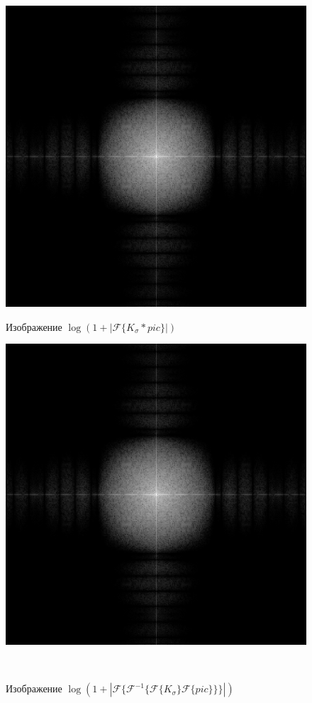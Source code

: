 \documentclass[a4paper]{article}
\begin{document}
\begin{figure}[H]
    \begin{minipage}{0.49\textwidth}
        \centering \includegraphics[width=\textwidth]{2/19_abs_fourier_log_norm_img_gaussian.png}
        \caption{Изображение $\log{(1+|\mathcal{F}\{K_\sigma*pic\}|)}$}
    \end{minipage}\hfill
    \begin{minipage}{0.49\textwidth}
        \centering \includegraphics[width=\textwidth]{2/19_abs_fourier_log_norm_img_gaussian1.png}
        \caption{Изображение $\log{(1+|\mathcal{F}\{\mathcal{F}^{-1}\{ \mathcal{F}\{K_\sigma\}\mathcal{F}\{pic\}\}\}|)}$}
    \end{minipage}\\[1em]
\end{figure}\noindent\
\end{document}
